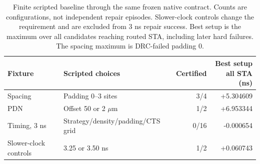 \begin{table}[htbp]\centering\small\setlength{\tabcolsep}{4pt}
\caption{Finite scripted baseline through the same frozen native contract. Counts are configurations, not independent repair episodes. Slower-clock controls change the requirement and are excluded from 3 ns repair success. Best setup is the maximum over all candidates reaching routed STA, including later hard failures. The spacing maximum is DRC-failed padding 0.}\label{tab:scriptedbaseline}
\begin{tabular}{@{}p{.23\linewidth}p{.39\linewidth}rr@{}}\toprule
Fixture & Scripted choices & Certified & \shortstack{Best setup\\all STA (ns)} \\
\midrule
Spacing & Padding 0--3 sites & 3/4 & +5.304609 \\
PDN & Offset 50 or 2 $\mu$m & 1/2 & +6.953344 \\
Timing, 3 ns & Strategy/density/padding/CTS grid & 0/16 & -0.000654 \\
Slower-clock controls & 3.25 or 3.50 ns & 1/2 & +0.060743 \\
\bottomrule\end{tabular}\end{table}
